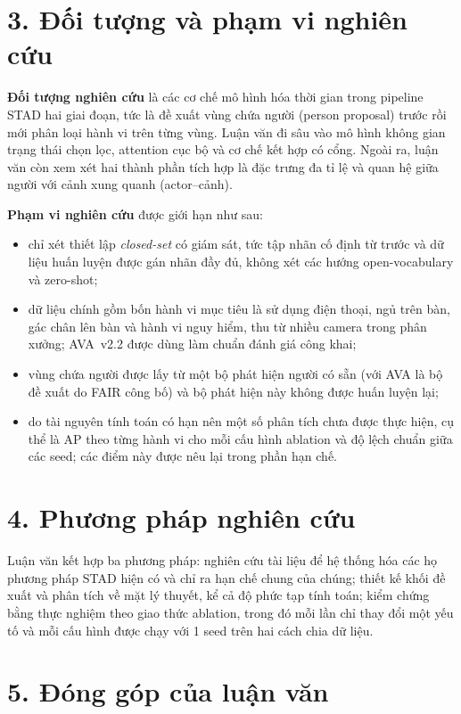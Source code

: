 \section*{3. Đối tượng và phạm vi nghiên cứu}

\textbf{Đối tượng nghiên cứu} là các cơ chế mô hình hóa thời gian trong pipeline STAD hai giai đoạn, tức là đề xuất vùng chứa người (person proposal) trước rồi mới phân loại hành vi trên từng vùng. Luận văn đi sâu vào mô hình không gian trạng thái chọn lọc, attention cục bộ và cơ chế kết hợp có cổng. Ngoài ra, luận văn còn xem xét hai thành phần tích hợp là đặc trưng đa tỉ lệ và quan hệ giữa người với cảnh xung quanh (actor--cảnh).

\textbf{Phạm vi nghiên cứu} được giới hạn như sau:
\begin{itemize}
  \item chỉ xét thiết lập \emph{closed-set} có giám sát, tức tập nhãn cố định từ trước và dữ liệu huấn luyện được gán nhãn đầy đủ, không xét các hướng open-vocabulary và zero-shot;
  \item dữ liệu chính gồm bốn hành vi mục tiêu là sử dụng điện thoại, ngủ trên bàn, gác chân lên bàn và hành vi nguy hiểm, thu từ nhiều camera trong phân xưởng; AVA~v2.2 \cite{gu2018ava} được dùng làm chuẩn đánh giá công khai;
  \item vùng chứa người được lấy từ một bộ phát hiện người có sẵn (với AVA là bộ đề xuất do FAIR công bố) và bộ phát hiện này không được huấn luyện lại;
  \item do tài nguyên tính toán có hạn nên một số phân tích chưa được thực hiện, cụ thể là AP theo từng hành vi cho mỗi cấu hình ablation và độ lệch chuẩn giữa các seed; các điểm này được nêu lại trong phần hạn chế.
\end{itemize}

\section*{4. Phương pháp nghiên cứu}

Luận văn kết hợp ba phương pháp: nghiên cứu tài liệu để hệ thống hóa các họ phương pháp STAD hiện có và chỉ ra hạn chế chung của chúng; thiết kế khối đề xuất và phân tích về mặt lý thuyết, kể cả độ phức tạp tính toán; kiểm chứng bằng thực nghiệm theo giao thức ablation, trong đó mỗi lần chỉ thay đổi một yếu tố và mỗi cấu hình được chạy với 1 seed trên hai cách chia dữ liệu.

\section*{5. Đóng góp của luận văn}

